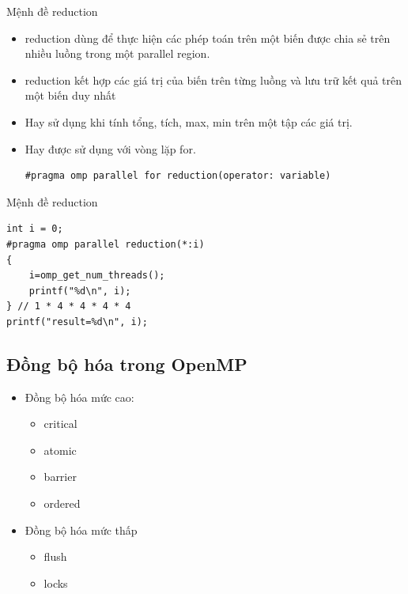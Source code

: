 \documentclass[10pt]{beamer}
\theoremstyle{remark}
\numberwithin{algocf}{section}
\numberwithin{equation}{section}
\numberwithin{dl}{section}
\numberwithin{figure}{section}
\begin{document}
\begin{frame}[fragile]{Mệnh đề reduction}
    \begin{itemize}
        \item reduction dùng để thực hiện các phép toán trên một biến được chia sẻ trên nhiều luồng trong một parallel region.
        \item reduction kết hợp các giá trị của biến trên từng luồng và lưu trữ kết quả trên một biến duy nhất
        \item Hay sử dụng khi tính tổng, tích, max, min trên một tập các giá trị.
        \item Hay được sử dụng với vòng lặp for.
        \begin{verbatim}
#pragma omp parallel for reduction(operator: variable)
        \end{verbatim}
    \end{itemize}
\end{frame}

\begin{frame}[fragile]{Mệnh đề reduction}
    \begin{verbatim}
int i = 0;
#pragma omp parallel reduction(*:i)
{
    i=omp_get_num_threads();
    printf("%d\n", i);
} // 1 * 4 * 4 * 4 * 4
printf("result=%d\n", i); 
    \end{verbatim}
\end{frame}

\subsection{Đồng bộ hóa trong OpenMP}
\begin{frame}
    \begin{itemize}
        \item Đồng bộ hóa mức cao:
        \begin{itemize}
            \item critical
            \item atomic 
            \item barrier
            \item ordered
        \end{itemize}
        \item Đồng bộ hóa mức thấp
        \begin{itemize}
            \item flush
            \item locks
        \end{itemize}
    \end{itemize}
\end{frame}
\end{document}
